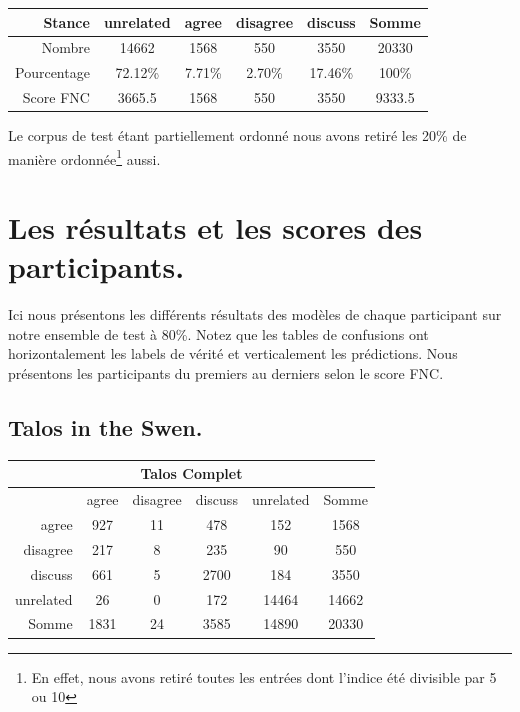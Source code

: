\documentclass[11pt,a4paper,oldfontcommands]{memoir}
\begin{document}
\begin{center}
 \begin{tabular}{ r | c c c c | c}
  Stance      & unrelated & agree  & disagree & discuss &        
  Somme                                                          \\
  \hline
  Nombre      & 14662     & 1568   & 550      & 3550    & 20330  \\
  Pourcentage & 72.12\%   & 7.71\% & 2.70\%   & 17.46\% & 100\%  \\
  Score FNC   & 3665.5    & 1568   & 550      & 3550    & 9333.5 \\
 \end{tabular}
\end{center}

Le corpus de test étant partiellement ordonné nous avons retiré les 20\% de manière ordonnée\footnote{En effet, nous avons retiré toutes les entrées dont l'indice été divisible par 5 ou 10} aussi.

\section{Les résultats et les scores des participants.}
Ici nous présentons les différents résultats des modèles de chaque participant sur notre ensemble de test à 80\%.
Notez que les tables de confusions ont horizontalement les labels de vérité et verticalement les prédictions.
Nous présentons les participants du premiers au derniers selon le score FNC.
\subsection{Talos in the Swen.}
\begin{center}
 \begin{tabular}{ r | c c c c | c }
  \multicolumn{6}{c}{Talos Complet}                          \\
  \hline
            & agree & disagree & discuss & unrelated & Somme \\
  \hline
  agree     & 927   & 11       & 478     & 152       & 1568  \\
  disagree  & 217   & 8        & 235     & 90        & 550   \\
  discuss   & 661   & 5        & 2700    & 184       & 3550  \\
  unrelated & 26    & 0        & 172     & 14464     & 14662 \\
  \hline
  Somme     & 1831  & 24       & 3585    & 14890     & 20330 \\
 \end{tabular}
\end{center}
\end{document}
